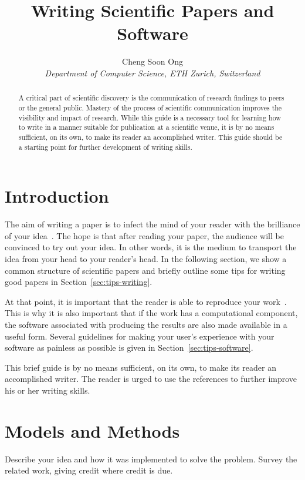 \documentclass[10pt,conference,compsocconf]{IEEEtran}
\begin{document}
\title{Writing Scientific Papers and Software}

\author{
  Cheng Soon Ong\\
  \textit{Department of Computer Science, ETH Zurich, Switzerland}
}

\maketitle

\begin{abstract}
  A critical part of scientific discovery is the
  communication of research findings to peers or the general public.
  Mastery of the process of scientific communication improves the
  visibility and impact of research. While this guide is a necessary
  tool for learning how to write in a manner suitable for publication
  at a scientific venue, it is by no means sufficient, on its own, to
  make its reader an accomplished writer. 
  This guide should be a starting point for further development of 
  writing skills.
\end{abstract}

\section{Introduction}

The aim of writing a paper is to infect the mind of your reader with
the brilliance of your idea~\cite{jones08}. 
The hope is that after reading your
paper, the audience will be convinced to try out your idea. In other
words, it is the medium to transport the idea from your head to your
reader's head. 
In the following
section, we show a common structure of scientific papers and briefly
outline some tips for writing good papers in
Section~\ref{sec:tips-writing}.

At that
point, it is important that the reader is able to reproduce your
work~\cite{schwab00,wavelab,gentleman05}. This is why it is also
important that if the work has a computational component, the software
associated with producing the results are also made available in a
useful form. Several guidelines for making your user's experience with
your software as painless as possible is given in
Section~\ref{sec:tips-software}.

This brief guide is by no means sufficient, on its own, to
make its reader an accomplished writer. The reader is urged to use the
references to further improve his or her writing skills.

\section{Models and Methods}
  Describe your idea and how it was implemented to solve
  the problem. Survey the related work, giving credit where credit is
  due.
\end{document}
